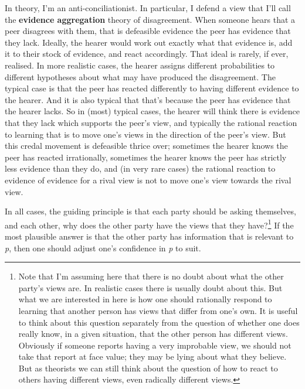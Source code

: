 In theory, I'm an anti-conciliationist. In particular, I defend a view that I'll call the \textbf{evidence aggregation} theory of disagreement. When someone hears that a peer disagrees with them, that is defeasible evidence the peer has evidence that they lack. Ideally, the hearer would work out exactly what that evidence is, add it to their stock of evidence, and react accordingly. That ideal is rarely, if ever, realised. In more realistic cases, the hearer assigns different probabilities to different hypotheses about what may have produced the disagreement. The typical case is that the peer has reacted differently to having different evidence to the hearer. And it is also typical that that's because the peer has evidence that the hearer lacks. So in (most) typical cases, the hearer will think there is evidence that they lack which supports the peer's view, and typically the rational reaction to learning that is to move one's views in the direction of the peer's view. But this credal movement is defeasible thrice over; sometimes the hearer knows the peer has reacted irrationally, sometimes the hearer knows the peer has strictly less evidence than they do, and (in very rare cases) the rational reaction to evidence of evidence for a rival view is not to move one's view towards the rival view.

In all cases, the guiding principle is that each party should be asking themselves, and each other, why does the other party have the views that they have?\footnote{Note that I'm assuming here that there is no doubt about what the other party's views are. In realistic cases there is usually doubt about this. But what we are interested in here is how one should rationally respond to learning that another person has views that differ from one's own. It is useful to think about this question separately from the question of whether one does really know, in a given situation, that the other person has different views. Obviously if someone reports having a very improbable view, we should not take that report at face value; they may be lying about what they believe. But as theorists we can still think about the question of how to react to others having different views, even radically different views.} If the most plausible answer is that the other party has information that is relevant to \emph{p}, then one should adjust one's confidence in \emph{p} to suit.

